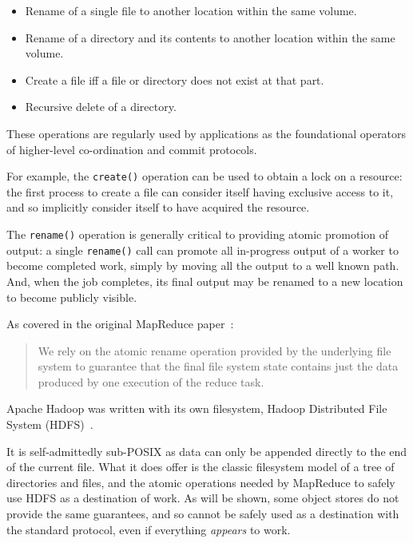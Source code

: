 \documentclass[format=acmsmall, screen=true, review=false]{acmart}
\begin{document}
\begin{itemize}
  \item Rename of a single file to another location within the same volume.
  \item Rename of a directory and its contents to another location within the same volume.
  \item Create a file iff a file or directory does not exist at that part.
  \item Recursive delete of a directory.
\end{itemize}

These operations are regularly used by applications as the foundational operators of higher-level
co-ordination and commit protocols.

For example, the \texttt{create()} operation can be used to obtain a lock on a resource:
the first process to create a file can consider itself having exclusive access to it,
and so implicitly consider itself to have acquired the resource.

The \texttt{rename()} operation is generally critical to providing atomic promotion
of output: a single \texttt{rename()} call can promote all in-progress output
of a worker to become completed work, simply by moving all the output to a well known path.
And, when the job completes, its final output may be renamed to a new location to become
publicly visible.

As covered in the original MapReduce paper\ \cite{MapReduce}:

\begin{quote}
We rely on the atomic rename operation provided by the underlying file system
to guarantee that the final file system state contains just the data produced
by one execution of the reduce task.
\end{quote}


Apache Hadoop was written with its own filesystem, Hadoop Distributed File System
(HDFS)\ \cite{Chansler2011}.

It is self-admittedly sub-POSIX as data can only be
appended directly to the end of the current file.
What it does offer is the classic filesystem model of
a tree of directories and files,
and the atomic operations needed by MapReduce to safely use HDFS
as a destination of work.
As will be shown, some object stores do not provide the same guarantees,
and so cannot be safely used as a destination with the standard protocol,
even if everything \emph{appears} to work.


\end{document}

